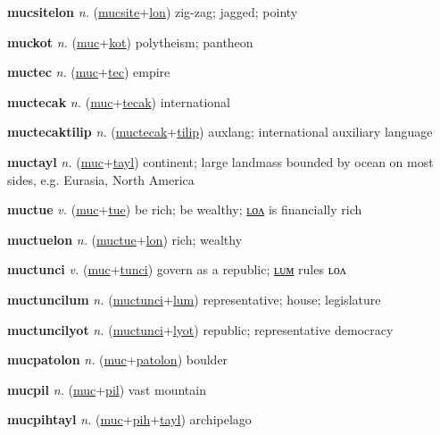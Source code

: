 \textbf{\hypertarget{mucsitelon}{mucsitelon}} \textit{n.} (\hyperlink{mucsite}{mucsite}+\allowbreak \hyperlink{lon}{lon})
zig-zag; jagged; pointy

\textbf{\hypertarget{muckot}{muckot}} \textit{n.} (\hyperlink{muc}{muc}+\allowbreak \hyperlink{kot}{kot})
polytheism; pantheon

\textbf{\hypertarget{muctec}{muctec}} \textit{n.} (\hyperlink{muc}{muc}+\allowbreak \hyperlink{tec}{tec})
empire

\textbf{\hypertarget{muctecak}{muctecak}} \textit{n.} (\hyperlink{muc}{muc}+\allowbreak \hyperlink{tecak}{tecak})
international

\textbf{\hypertarget{muctecaktilip}{muctecaktilip}} \textit{n.} (\hyperlink{muctecak}{muctecak}+\allowbreak \hyperlink{tilip}{tilip})
auxlang; international auxiliary language

\textbf{\hypertarget{muctayl}{muctayl}} \textit{n.} (\hyperlink{muc}{muc}+\allowbreak \hyperlink{tayl}{tayl})
continent; large landmass bounded by ocean on most sides, e.g. Eurasia, North America

\textbf{\hypertarget{muctue}{muctue}} \textit{v.} (\hyperlink{muc}{muc}+\allowbreak \hyperlink{tue}{tue})
be rich; be wealthy; \hyperlink{muctuelon}{ʟᴏᴧ} is financially rich

\textbf{\hypertarget{muctuelon}{muctuelon}} \textit{n.} (\hyperlink{muctue}{muctue}+\allowbreak \hyperlink{lon}{lon})
rich; wealthy

\textbf{\hypertarget{muctunci}{muctunci}} \textit{v.} (\hyperlink{muc}{muc}+\allowbreak \hyperlink{tunci}{tunci})
govern as a republic; \hyperlink{muctuncilum}{ʟᴜᴍ} rules ʟᴏᴧ

\textbf{\hypertarget{muctuncilum}{muctuncilum}} \textit{n.} (\hyperlink{muctunci}{muctunci}+\allowbreak \hyperlink{lum}{lum})
representative; house; legislature

\textbf{\hypertarget{muctuncilyot}{muctuncilyot}} \textit{n.} (\hyperlink{muctunci}{muctunci}+\allowbreak \hyperlink{lyot}{lyot})
republic; representative democracy

\textbf{\hypertarget{mucpatolon}{mucpatolon}} \textit{n.} (\hyperlink{muc}{muc}+\allowbreak \hyperlink{patolon}{patolon})
boulder

\textbf{\hypertarget{mucpil}{mucpil}} \textit{n.} (\hyperlink{muc}{muc}+\allowbreak \hyperlink{pil}{pil})
vast mountain

\textbf{\hypertarget{mucpihtayl}{mucpihtayl}} \textit{n.} (\hyperlink{muc}{muc}+\allowbreak \hyperlink{pih}{pih}+\allowbreak \hyperlink{tayl}{tayl})
archipelago

